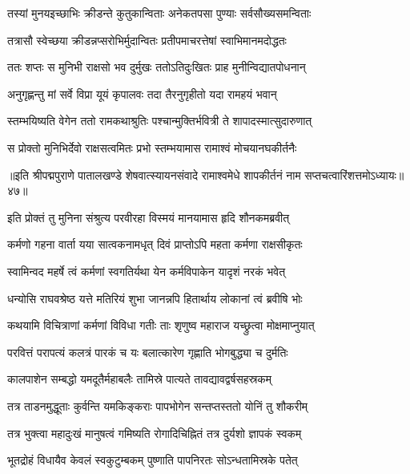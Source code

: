 \twolineshloka
{तस्यां मुनयइच्छाभिः क्रीडन्ते कुतुकान्विताः}
{अनेकतपसा पुण्याः सर्वसौख्यसमन्विताः}%

\twolineshloka
{तत्रासौ स्वेच्छया क्रीडन्नप्सरोभिर्मुदान्वितः}
{प्रतीपमाचरत्तेषां स्वाभिमानमदोद्धतः}%

\twolineshloka
{ततः शप्तः स मुनिभी राक्षसो भव दुर्मुखः}
{ततोऽतिदुःखितः प्राह मुनीन्विद्यातपोधनान्}%

\twolineshloka
{अनुगृह्णन्तु मां सर्वे विप्रा यूयं कृपालवः}
{तदा तैरनुगृहीतो यदा रामहयं भवान्}%

\twolineshloka
{स्तम्भयिष्यति वेगेन ततो रामकथाश्रुतिः}
{पश्चान्मुक्तिर्भवित्री ते शापादस्मात्सुदारुणात्}%

\twolineshloka
{स प्रोक्तो मुनिभिर्देवो राक्षसत्वमितः प्रभो}
{स्तम्भयामास रामाश्वं मोचयानघकीर्तनैः}%

॥इति श्रीपद्मपुराणे पातालखण्डे शेषवात्स्यायनसंवादे रामाश्वमेधे शापकीर्तनं नाम सप्तचत्वारिंशत्तमोऽध्यायः॥४७॥



\twolineshloka
{इति प्रोक्तं तु मुनिना संश्रुत्य परवीरहा}
{विस्मयं मानयामास हृदि शौनकमब्रवीत्}%


\twolineshloka
{कर्मणो गहना वार्ता यया सात्वकनामधृत्}
{दिवं प्राप्तोऽपि महता कर्मणा राक्षसीकृतः}%

\twolineshloka
{स्वामिन्वद महर्षे त्वं कर्मणां स्वगतिर्यथा}
{येन कर्मविपाकेन यादृशं नरकं भवेत्}%


\twolineshloka
{धन्योसि राघवश्रेष्ठ यत्ते मतिरियं शुभा}
{जानन्नपि हितार्थाय लोकानां त्वं ब्रवीषि भोः}%

\twolineshloka
{कथयामि विचित्राणां कर्मणां विविधा गतीः}
{ताः शृणुष्व महाराज यच्छ्रुत्वा मोक्षमाप्नुयात्}%

\twolineshloka
{परवित्तं परापत्यं कलत्रं पारकं च यः}
{बलात्कारेण गृह्णाति भोगबुद्ध्या च दुर्मतिः}%

\twolineshloka
{कालपाशेन सम्बद्धो यमदूतैर्महाबलैः}
{तामिस्रे पात्यते तावद्यावद्वर्षसहस्रकम्}%

\twolineshloka
{तत्र ताडनमुद्धूताः कुर्वन्ति यमकिङ्कराः}
{पापभोगेन सन्तप्तस्ततो योनिं तु शौकरीम्}%

\twolineshloka
{तत्र भुक्त्वा महादुःखं मानुषत्वं गमिष्यति}
{रोगादिचिह्नितं तत्र दुर्यशो ज्ञापकं स्वकम्}%

\twolineshloka
{भूतद्रोहं विधायैव केवलं स्वकुटुम्बकम्}
{पुष्णाति पापनिरतः सोऽन्धतामिस्रके पतेत्}%


